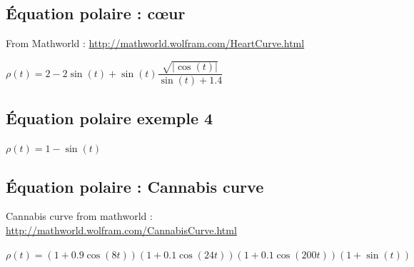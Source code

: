 \newpage
\subsection{Équation polaire : cœur}
From Mathworld :  \url{http://mathworld.wolfram.com/HeartCurve.html}

 $\rho(t)= 2-2\sin(t)+\sin(t)\dfrac{\sqrt{\lvert\cos(t)\rvert}}{\sin(t)+1.4}$

\begin{center}
\begin{tkzexample}[]
\end{tkzexample}
\end{center}

\subsection{Équation polaire exemple 4}
 $\rho(t)= 1-\sin(t)$

\begin{center}
\begin{tkzexample}[]
\end{tkzexample}
\end{center}

\newpage
\subsection{Équation polaire : Cannabis curve}
 Cannabis curve from mathworld : \url{http://mathworld.wolfram.com/CannabisCurve.html}

$ \rho(t)=(1+0.9\cos(8t))(1+0.1\cos(24t))(1+0.1\cos(200t))(1+\sin(t)) $

\begin{center}
\begin{tkzexample}[vbox]
\end{tkzexample}
\end{center}

